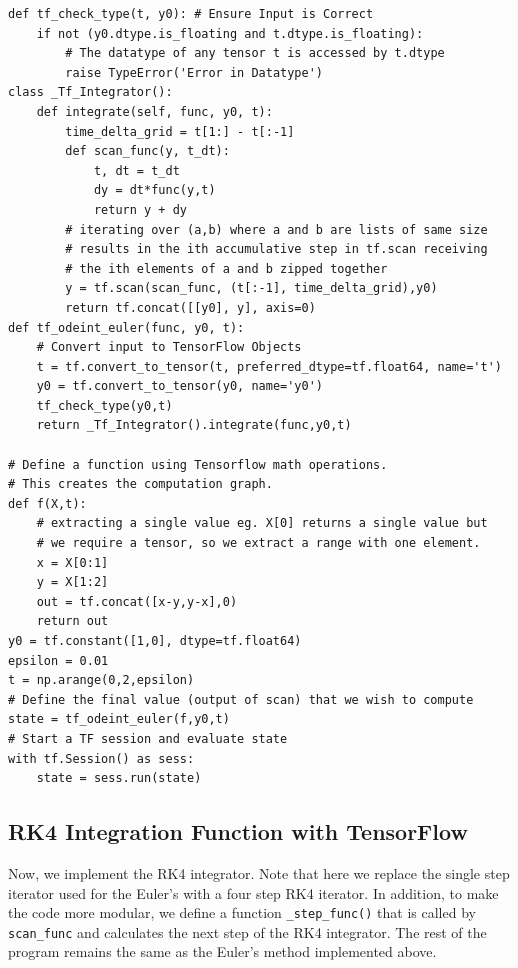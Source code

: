 \documentclass[10pt,letterpaper]{article}
\begin{document}
\begin{nolinenumbers}
\begin{verbatim}
def tf_check_type(t, y0): # Ensure Input is Correct
    if not (y0.dtype.is_floating and t.dtype.is_floating): 
        # The datatype of any tensor t is accessed by t.dtype
        raise TypeError('Error in Datatype')
class _Tf_Integrator():
    def integrate(self, func, y0, t): 
        time_delta_grid = t[1:] - t[:-1]  
        def scan_func(y, t_dt): 
            t, dt = t_dt
            dy = dt*func(y,t)
            return y + dy
        # iterating over (a,b) where a and b are lists of same size
        # results in the ith accumulative step in tf.scan receiving
        # the ith elements of a and b zipped together
        y = tf.scan(scan_func, (t[:-1], time_delta_grid),y0) 
        return tf.concat([[y0], y], axis=0)
def tf_odeint_euler(func, y0, t):
    # Convert input to TensorFlow Objects
    t = tf.convert_to_tensor(t, preferred_dtype=tf.float64, name='t')
    y0 = tf.convert_to_tensor(y0, name='y0')
    tf_check_type(y0,t)
    return _Tf_Integrator().integrate(func,y0,t)
    
# Define a function using Tensorflow math operations. 
# This creates the computation graph.
def f(X,t):
    # extracting a single value eg. X[0] returns a single value but
    # we require a tensor, so we extract a range with one element.
    x = X[0:1] 
    y = X[1:2]
    out = tf.concat([x-y,y-x],0)
    return out
y0 = tf.constant([1,0], dtype=tf.float64)
epsilon = 0.01
t = np.arange(0,2,epsilon)
# Define the final value (output of scan) that we wish to compute
state = tf_odeint_euler(f,y0,t)
# Start a TF session and evaluate state
with tf.Session() as sess:
    state = sess.run(state)
\end{verbatim}

\subsection*{RK4 Integration Function with TensorFlow}

Now, we implement the RK4 integrator. Note that here we replace the single step iterator used for the Euler's with a four step RK4 iterator. In addition, to make the code more modular, we define a function \texttt{\_step\_func()} that is called by \texttt{scan\_func} and calculates the next step of the RK4 integrator. The rest of the program remains the same as the Euler's method implemented above.


\end{nolinenumbers}
\end{document}
